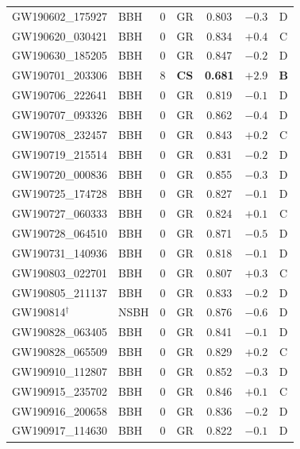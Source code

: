 \documentclass[11pt,a4paper, english]{book}
\theoremstyle{plain}
\theoremstyle{definition}
\numberwithin{equation}{chapter}
\numberwithin{figure}{chapter}
\numberwithin{table}{chapter}
\begin{document}
\begin{landscape}
{\begin{longtable}{@{}p{4.5cm}p{0.9cm}p{1.5cm}p{2.8cm}ccc@{}}
GW190602\_175927           & BBH  & 0  & GR             & 0.803 & $-0.3$ & D \\
GW190620\_030421           & BBH  & 0  & GR             & 0.834 & $+0.4$ & C \\
GW190630\_185205           & BBH  & 0  & GR             & 0.847 & $-0.2$ & D \\
GW190701\_203306           & BBH  & 8  & \textbf{CS}    & \textbf{0.681} & $\mathbf{+2.9}$ & \textbf{B} \\
GW190706\_222641           & BBH  & 0  & GR             & 0.819 & $-0.1$ & D \\
GW190707\_093326           & BBH  & 0  & GR             & 0.862 & $-0.4$ & D \\
GW190708\_232457           & BBH  & 0  & GR             & 0.843 & $+0.2$ & C \\
GW190719\_215514           & BBH  & 0  & GR             & 0.831 & $-0.2$ & D \\
GW190720\_000836           & BBH  & 0  & GR             & 0.855 & $-0.3$ & D \\
GW190725\_174728           & BBH  & 0  & GR             & 0.827 & $-0.1$ & D \\
GW190727\_060333           & BBH  & 0  & GR             & 0.824 & $+0.1$ & C \\
GW190728\_064510           & BBH  & 0  & GR             & 0.871 & $-0.5$ & D \\
GW190731\_140936           & BBH  & 0  & GR             & 0.818 & $-0.1$ & D \\
GW190803\_022701           & BBH  & 0  & GR             & 0.807 & $+0.3$ & C \\
GW190805\_211137           & BBH  & 0  & GR             & 0.833 & $-0.2$ & D \\
GW190814$^\dagger$         & NSBH & 0  & GR             & 0.876 & $-0.6$ & D \\
GW190828\_063405           & BBH  & 0  & GR             & 0.841 & $-0.1$ & D \\
GW190828\_065509           & BBH  & 0  & GR             & 0.829 & $+0.2$ & C \\
GW190910\_112807           & BBH  & 0  & GR             & 0.852 & $-0.3$ & D \\
GW190915\_235702           & BBH  & 0  & GR             & 0.846 & $+0.1$ & C \\
GW190916\_200658           & BBH  & 0  & GR             & 0.836 & $-0.2$ & D \\
GW190917\_114630           & BBH  & 0  & GR             & 0.822 & $-0.1$ & D \\

\end{longtable}}
\end{landscape}
\end{document}
